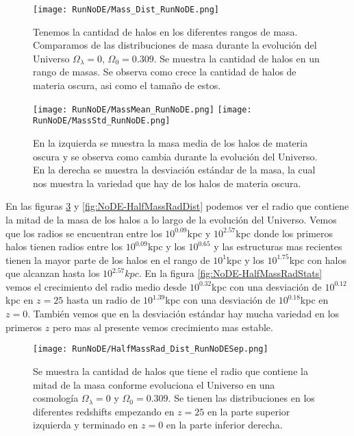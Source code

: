 \begin{figure}[H]
    \centering
    \texttt{[image: RunNoDE/Mass\_Dist\_RunNoDE.png]}
    \caption[Comparación de distribución de masa]{\footnotesize Tenemos la cantidad de halos en los diferentes rangos de masa. Comparamos de las distribuciones de masa durante la evolución del Universo $\Omega_\lambda = 0$, $\Omega_0 = 0.309$. Se muestra la cantidad de halos en un rango de masas. Se observa como crece la cantidad de halos de materia oscura, asi como el tamaño de estos.}
    \label{fig:NoDE-MassDist}
\end{figure}

\begin{figure}[H]
    \centering
    \texttt{[image: RunNoDE/MassMean\_RunNoDE.png]}
    \texttt{[image: RunNoDE/MassStd\_RunNoDE.png]}
    \caption[Media y desviación estándar de la distribución de masa]{\footnotesize En la izquierda se muestra la masa media de los halos de materia oscura y se observa como cambia durante la evolución del Universo. En la derecha se muestra la desviación estándar de la masa, la cual nos muestra la variedad que hay de los halos de materia oscura.}
    \label{fig:NoDE-MassStats}
\end{figure}

En las figuras \ref{fig:NoDE-HalfMassRadDistSep} y \ref{fig:NoDE-HalfMassRadDist} podemos ver el radio que contiene la mitad de la masa de los halos a lo largo de la evolución del Universo. Vemos que los radios se encuentran entre los $10^{0.09}$kpc y $10^{2.57}$kpc donde los primeros halos tienen radios entre los $10^{0.09}$kpc y los $10^{0.65}$ y las estructuras mas recientes tienen la mayor parte de los halos en el rango de $10^{1}$kpc y los $10^{1.75}$kpc con halos que alcanzan hasta los $10^{2.57}kpc$. En la figura \ref{fig:NoDE-HalfMassRadStats} vemos el crecimiento del radio medio desde $10^{0.32}$kpc con una desviación de $10^{0.12}$kpc en $z=25$ hasta un radio de $10^{1.39}$kpc con una desviación de $10^{0.18}$kpc en $z=0$. También vemos que en la desviación estándar hay mucha variedad en los primeros $z$ pero mas al presente vemos crecimiento mas estable.

\begin{figure}[H]
    \centering
    \texttt{[image: RunNoDE/HalfMassRad\_Dist\_RunNoDESep.png]}
    \caption[Radio que contiene la mitad de la masa]{\footnotesize Se muestra la cantidad de halos que tiene el radio que contiene la mitad de la masa conforme evoluciona el Universo en una cosmología $\Omega_\lambda = 0$ y $\Omega_0 = 0.309$. Se tienen las distribuciones en los diferentes redshifts empezando en $z=25$ en la parte superior izquierda y terminado en $z=0$ en la parte inferior derecha.}
    \label{fig:NoDE-HalfMassRadDistSep}
\end{figure}

